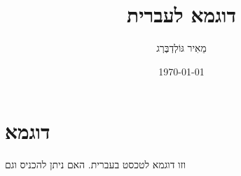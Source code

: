 \documentclass[11pt]{article}
\author{‪מֵאִיר גּוֹלְדְבֶּרְג}
\date{\today}
\title{דוגמא לעברית}
\begin{document}
\maketitle
\setcounter{tocdepth}{1}
\tableofcontents


\section{דוגמא}
\label{sec:org40bc2f0}

וזו דוגמא לטכסט בעברית. האם ניתן להכניס  וגם  
\end{document}
